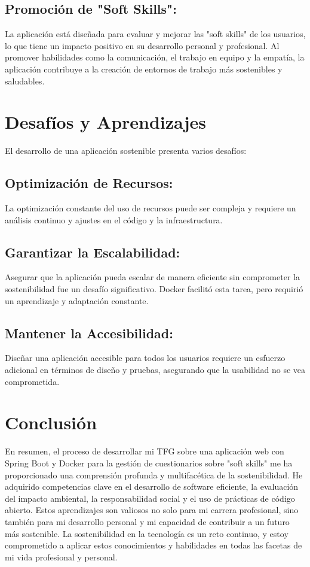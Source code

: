 \subsection{Promoción de "Soft Skills":}
La aplicación está diseñada para evaluar y mejorar las "soft skills" de los usuarios, lo que tiene un impacto positivo en su desarrollo personal y profesional. Al promover habilidades como la comunicación, el trabajo en equipo y la empatía, la aplicación contribuye a la creación de entornos de trabajo más sostenibles y saludables.

\section{Desafíos y Aprendizajes}
El desarrollo de una aplicación sostenible presenta varios desafíos:

\subsection{Optimización de Recursos:}
La optimización constante del uso de recursos puede ser compleja y requiere un análisis continuo y ajustes en el código y la infraestructura.

\subsection{Garantizar la Escalabilidad:}
Asegurar que la aplicación pueda escalar de manera eficiente sin comprometer la sostenibilidad fue un desafío significativo. Docker facilitó esta tarea, pero requirió un aprendizaje y adaptación constante.

\subsection{Mantener la Accesibilidad:}
Diseñar una aplicación accesible para todos los usuarios requiere un esfuerzo adicional en términos de diseño y pruebas, asegurando que la usabilidad no se vea comprometida.

\section{Conclusión}
En resumen, el proceso de desarrollar mi TFG sobre una aplicación web con Spring Boot y Docker para la gestión de cuestionarios sobre "soft skills" me ha proporcionado una comprensión profunda y multifacética de la sostenibilidad. He adquirido competencias clave en el desarrollo de software eficiente, la evaluación del impacto ambiental, la responsabilidad social y el uso de prácticas de código abierto. Estos aprendizajes son valiosos no solo para mi carrera profesional, sino también para mi desarrollo personal y mi capacidad de contribuir a un futuro más sostenible. La sostenibilidad en la tecnología es un reto continuo, y estoy comprometido a aplicar estos conocimientos y habilidades en todas las facetas de mi vida profesional y personal.

